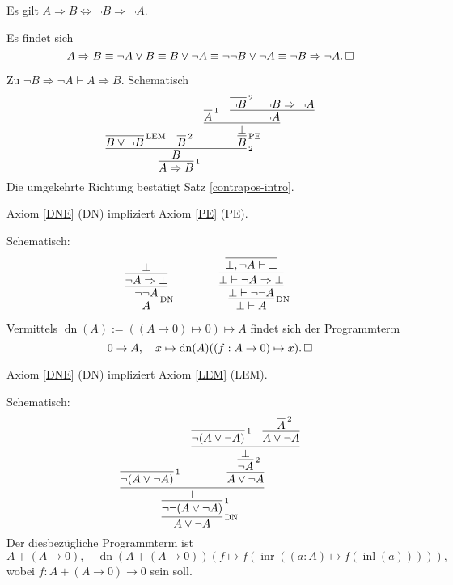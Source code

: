 \begin{Satz}[Kontraposition] \strong{[LEM]}\newlinefirst
Es gilt $A\Rightarrow B \iff \neg B\Rightarrow\neg A$.
\end{Satz}
\begin{Beweis}
Es findet sich
\[A\Rightarrow B \equiv \neg A\lor B\equiv B\lor\neg A
\equiv \neg\neg B\lor\neg A \equiv \neg B\Rightarrow \neg A.\,\square\]
\end{Beweis}
\begin{Beweis}
Zu $\neg B\Rightarrow\neg A\vdash A\Rightarrow B$. Schematisch
\[
\infer[\infernote{1}]{A\Rightarrow B}{
  \infer[\infernote{2}]{B}{
    \infer[\infernote{LEM}]{B\lor \neg B}{}
    & \infer[\infernote{2}]{B}{}
    & \infer[\infernote{PE}]{B}{
      \infer{\bot}{
        \infer[\infernote{1}]{A}{}
        & \infer{\neg A}{
          \infer[\infernote{2}]{\neg B}{}
          & \neg B\Rightarrow\neg A}}}}}
\]
Die umgekehrte Richtung bestätigt Satz \ref{contrapos-intro}.\,\qedsymbol
\end{Beweis}

\begin{Satz}
Axiom \ref{DNE} (DN) impliziert
Axiom \ref{PE} (PE).
\end{Satz}
\begin{Beweis}
Schematisch:
\[
\begin{array}{@{}l@{\qquad\qquad}l}
\infer[\infernote{DN}]{A}{
  \infer{\neg\neg A}{
    \infer{\neg A\Rightarrow\bot}{\bot}
  }
}
&
\infer[\infernote{DN}]{\bot\vdash A}{
  \infer{\bot\vdash\neg\neg A}{
    \infer{\bot\vdash \neg A\Rightarrow\bot}{
      \infer{\bot,\neg A\vdash\bot}{}
    }
  }
}
\end{array}
\]
Vermittels $\operatorname{dn}(A):=((A\mapsto 0)\mapsto 0)\mapsto A$
findet sich der Programmterm
\[0\to A,\quad x\mapsto \operatorname{dn}(A)((f: A\to 0)\mapsto x).
\,\square\]
\end{Beweis}

\begin{Satz}
Axiom \ref{DNE} (DN) impliziert Axiom \ref{LEM} (LEM).
\end{Satz}
\begin{Beweis}
Schematisch:
\[\infer[\infernote{DN}]{A\lor\neg A}{
  \infer[\infernote{1}]{\neg\neg (A\lor\neg A)}{
    \infer{\bot}{
      \infer[\infernote{1}]{\neg (A\lor\neg A)}{}
    & \infer{A\lor\neg A}{
        \infer[\infernote{2}]{\neg A}{
          \infer{\bot}{
            \infer[\infernote{1}]{\neg (A\lor\neg A)}{}
          & \infer{A\lor\neg A}{\infer[\infernote{2}]{A}{}}}}}}}}
\]
Der diesbezügliche Programmterm ist
\[A + (A\to 0),\quad
\operatorname{dn}(A + (A\to 0))(
  f\mapsto f(\operatorname{inr}((a: A)\mapsto f(\operatorname{inl}(a))))
),\]
wobei $f\colon A + (A \to 0)\to 0$ sein soll.\,\qedsymbol
\end{Beweis}

